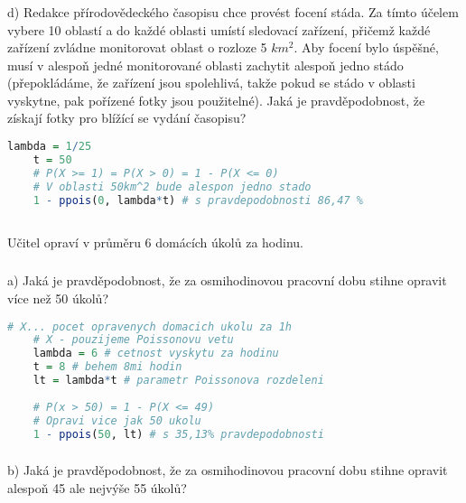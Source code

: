 \documentclass{article}%
\begin{document}
\subsubsection{}
d) Redakce přírodovědeckého časopisu chce provést focení stáda. Za tímto účelem vybere 10 oblastí a do každé oblasti umístí sledovací zařízení, přičemž každé zařízení zvládne monitorovat oblast o rozloze 5 $km^2$. Aby focení bylo úspěšné, musí v alespoň jedné monitorované oblasti zachytit alespoň jedno stádo (přepokládáme, že zařízení jsou spolehlivá, takže pokud se stádo v oblasti vyskytne, pak pořízené fotky jsou použitelné). Jaká je pravděpodobnost, že získají fotky pro blížící se vydání časopisu?

\begin{lstlisting}[language=R, showstringspaces=false, basicstyle=\small]
    lambda = 1/25 
    t = 50 
    # P(X >= 1) = P(X > 0) = 1 - P(X <= 0)
    # V oblasti 50km^2 bude alespon jedno stado
    1 - ppois(0, lambda*t) # s pravdepodobnosti 86,47 %
\end{lstlisting}


\newpage
\subsection{}
Učitel opraví v průměru 6 domácích úkolů za hodinu.

\subsubsection{}
a) Jaká je pravděpodobnost, že za osmihodinovou pracovní dobu stihne opravit více než 50 úkolů?

\begin{lstlisting}[language=R, showstringspaces=false, basicstyle=\small]
    # X... pocet opravenych domacich ukolu za 1h
    # X - pouzijeme Poissonovu vetu
    lambda = 6 # cetnost vyskytu za hodinu
    t = 8 # behem 8mi hodin
    lt = lambda*t # parametr Poissonova rozdeleni
    
    # P(x > 50) = 1 - P(X <= 49)
    # Opravi vice jak 50 ukolu
    1 - ppois(50, lt) # s 35,13% pravdepodobnosti    
\end{lstlisting}

\subsubsection{}
b) Jaká je pravděpodobnost, že za osmihodinovou pracovní dobu stihne opravit alespoň 45 ale nejvýše 55 úkolů?
\end{document}
